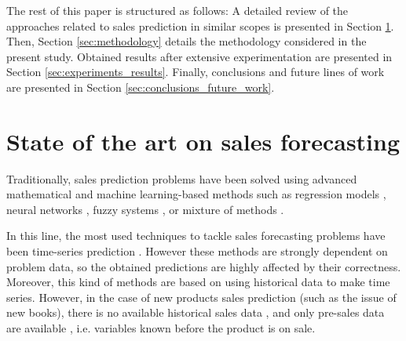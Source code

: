 \documentclass[a4paper,10pt,onecolumn,preprint,3p]{elsarticle}
\begin{document}
The rest of this paper is structured as follows: 
A detailed review of the approaches related to sales prediction in similar scopes is presented in Section \ref{sec:soa}.
Then, Section \ref{sec:methodology} details the methodology considered in the present study. 
Obtained results after extensive experimentation are presented in Section \ref{sec:experiments_results}.
Finally, conclusions and future lines of work are presented in Section \ref{sec:conclusions_future_work}.


\section{State of the art on sales forecasting} 
\label{sec:soa}

Traditionally, sales prediction problems have been solved using advanced mathematical and machine learning-based methods
such as regression models \cite{Papalexopoulos1990}, neural networks \cite{Yoo1999}, fuzzy systems \cite{Mastorocostas2001}, or mixture of methods \cite{Chang2006715,Meulstee2008,ChiJie2012}.

In this line, the most used techniques to tackle sales forecasting problems have been time-series prediction
\cite{Chu2003,Brown1959,Winters1960,Box1969,Papalexopoulos1990,KayacanUK10}.
However these methods are strongly dependent on problem data, so the obtained predictions are highly affected by their correctness.
Moreover, this kind of methods are based on using historical data to make time series. However, in the case of new products sales prediction (such as the issue of new books), there is no available historical sales data \cite{ChingChin2010}, 
and only pre-sales data are available \cite{FaderHardie2005,Madsen2008}, 
i.e. variables known before the product is on sale. 
\end{document}
